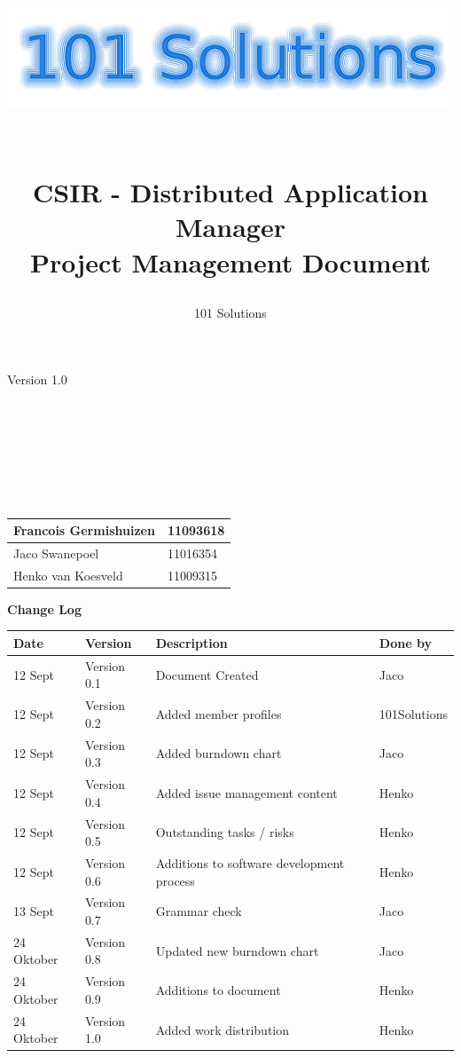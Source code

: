 \documentclass[a4paper,12pt,final]{article}
\title{
\begin{center}
  	\includegraphics[scale=0.3]{101Logo.png} 
  \end{center}
  \textbf{\\}
CSIR - Distributed Application Manager\\
Project Management Document\\
}
\author{101 Solutions}
\begin{document}
\maketitle
\begin{center}
Version 1.0
\end{center}
\textbf{\\}
\textbf{\\}
\textbf{\\}
\textbf{\\}
\textbf{\\}
\textbf{\\}
\begin{center}
\begin{tabular}{|l|l|}
\hline
Francois Germishuizen & 11093618\\
\hline
Jaco Swanepoel & 11016354\\
\hline
Henko van Koesveld & 11009315\\
\hline
\end{tabular}
\end{center}
\thispagestyle{empty}
\newpage
\thispagestyle{empty}
\textbf{\large{Change Log}}
\vspace{6pt}\newline
\begin{tabular}{|l|l|l|l|}
\hline
\textbf{Date} & \textbf{Version} & \textbf{Description} & \textbf{Done by}\\
\hline
12 Sept & Version 0.1 & Document Created & Jaco\\
\hline
12 Sept & Version 0.2 & Added member profiles & 101Solutions\\
\hline
12 Sept & Version 0.3 & Added burndown chart & Jaco\\
\hline
12 Sept & Version 0.4 & Added issue management content & Henko\\
\hline
12 Sept & Version 0.5 & Outstanding tasks / risks & Henko\\
\hline
12 Sept & Version 0.6 & Additions to  software development process & Henko\\
\hline
13 Sept & Version 0.7 & Grammar check & Jaco\\
\hline
24 Oktober & Version 0.8 & Updated new burndown chart & Jaco\\
\hline
24 Oktober & Version 0.9 & Additions to document & Henko\\
\hline
24 Oktober & Version 1.0 & Added work distribution & Henko\\
\hline
\end{tabular}
\newpage
\tableofcontents
\thispagestyle{empty}
\newpage
\end{document}
